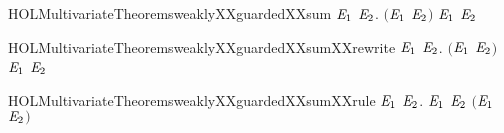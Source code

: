 \newcommand{\HOLMultivariateTheoremsweaklyXXguardedXXrules}{\UseVerbatim{HOLMultivariateTheoremsweaklyXXguardedXXrules}}
\begin{SaveVerbatim}{HOLMultivariateTheoremsweaklyXXguardedXXsum}
\HOLTokenTurnstile{} \HOLSymConst{\HOLTokenForall{}} \ensuremath{\HOLBoundVar{E}\sb{\mathrm{1}}} \ensuremath{\HOLBoundVar{E}\sb{\mathrm{2}}}.
         \ensuremath{(}\ensuremath{\HOLBoundVar{E}\sb{\mathrm{1}}} \HOLSymConst{\ensuremath{+}} \ensuremath{\HOLBoundVar{E}\sb{\mathrm{2}}}\ensuremath{)} \HOLSymConst{\HOLTokenImp{}}
         \ensuremath{\HOLBoundVar{E}\sb{\mathrm{1}}} \HOLSymConst{\HOLTokenConj{}}   \ensuremath{\HOLBoundVar{E}\sb{\mathrm{2}}}
\end{SaveVerbatim}
\newcommand{\HOLMultivariateTheoremsweaklyXXguardedXXsum}{\UseVerbatim{HOLMultivariateTheoremsweaklyXXguardedXXsum}}
\begin{SaveVerbatim}{HOLMultivariateTheoremsweaklyXXguardedXXsumXXrewrite}
\HOLTokenTurnstile{} \HOLSymConst{\HOLTokenForall{}} \ensuremath{\HOLBoundVar{E}\sb{\mathrm{1}}} \ensuremath{\HOLBoundVar{E}\sb{\mathrm{2}}}.
         \ensuremath{(}\ensuremath{\HOLBoundVar{E}\sb{\mathrm{1}}} \HOLSymConst{\ensuremath{+}} \ensuremath{\HOLBoundVar{E}\sb{\mathrm{2}}}\ensuremath{)} \HOLSymConst{\HOLTokenEquiv{}}
         \ensuremath{\HOLBoundVar{E}\sb{\mathrm{1}}} \HOLSymConst{\HOLTokenConj{}}   \ensuremath{\HOLBoundVar{E}\sb{\mathrm{2}}}
\end{SaveVerbatim}
\newcommand{\HOLMultivariateTheoremsweaklyXXguardedXXsumXXrewrite}{\UseVerbatim{HOLMultivariateTheoremsweaklyXXguardedXXsumXXrewrite}}
\begin{SaveVerbatim}{HOLMultivariateTheoremsweaklyXXguardedXXsumXXrule}
\HOLTokenTurnstile{} \HOLSymConst{\HOLTokenForall{}} \ensuremath{\HOLBoundVar{E}\sb{\mathrm{1}}} \ensuremath{\HOLBoundVar{E}\sb{\mathrm{2}}}.
         \ensuremath{\HOLBoundVar{E}\sb{\mathrm{1}}} \HOLSymConst{\HOLTokenConj{}}   \ensuremath{\HOLBoundVar{E}\sb{\mathrm{2}}} \HOLSymConst{\HOLTokenImp{}}
         \ensuremath{(}\ensuremath{\HOLBoundVar{E}\sb{\mathrm{1}}} \HOLSymConst{\ensuremath{+}} \ensuremath{\HOLBoundVar{E}\sb{\mathrm{2}}}\ensuremath{)}
\end{SaveVerbatim}
